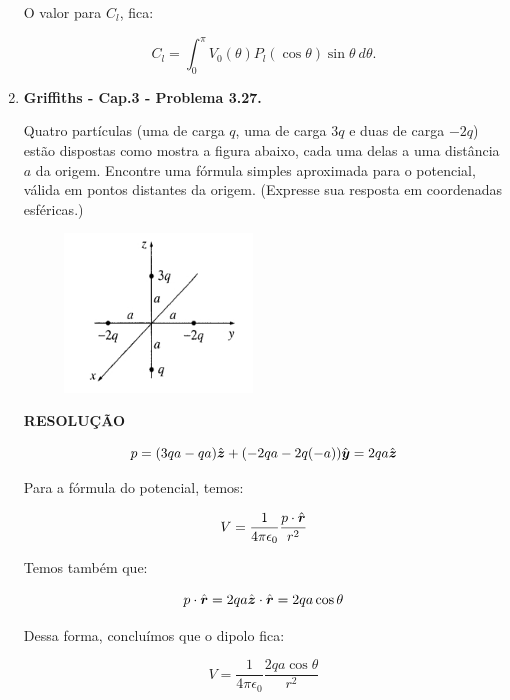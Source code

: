 \documentclass[11pt,a4paper]{article}
\newcommand{\mat}[1]{\mbox{\boldmath{$#1$}}}
\begin{document}
\begin{enumerate}
O valor para $C_l$, fica:

$$C_l = \displaystyle\int_0^\pi V_0(\theta) P_l (\cos \theta) \sin \theta \ d\theta.$$


\item \textbf{Griffiths - Cap.3 - Problema 3.27.}

Quatro partículas (uma de carga $q$, uma de carga $3q$ e duas de carga $-2q$) estão dispostas como mostra a figura abaixo, cada uma delas a uma distância $a$ da origem. Encontre uma fórmula simples aproximada para o potencial, válida em pontos distantes da origem. (Expresse sua resposta em coordenadas esféricas.)

\begin{figure}[h]	
\centering %
\includegraphics[width=5cm]{Selection_085.jpg} 
\end{figure}

\textbf{RESOLUÇÃO}

$$p = (3qa - qa)\hat{\mat{z}} + (-2qa - 2q(-a))\hat{\mat{y}} = 2qa \hat{\mat{z}}$$

Para a fórmula do potencial, temos:

$$V = \displaystyle\dfrac{1}{4\pi \epsilon_0} \displaystyle\dfrac{p \cdot \hat{\mat{r}}}{r^2}$$

Temos também que:

$$p \cdot \hat{\mat{r}} = 2qa\hat{\mat{z}} \cdot \hat{\mat{r}} = 2qa \cos \theta$$

Dessa forma, concluímos que o dipolo fica:

$$V = \displaystyle\dfrac{1}{4\pi \epsilon_0} \displaystyle\dfrac{2qa \cos \theta}{r^2}$$



\end{enumerate}
	
\end{document}
